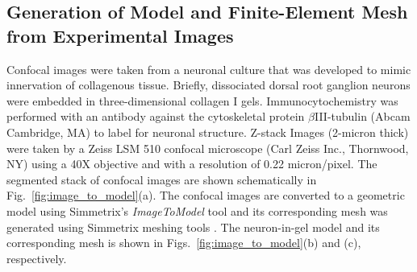 \documentclass[10pt]{asme2ej}
\begin{document}
\subsection{Generation of Model and Finite-Element Mesh from Experimental Images}
Confocal images were taken from a neuronal culture that was developed to mimic innervation of collagenous tissue. Briefly, dissociated dorsal root ganglion neurons were embedded in three-dimensional collagen I gels. Immunocytochemistry was performed with an antibody against the cytoskeletal protein $\beta$III-tubulin (Abcam Cambridge, MA) to label for neuronal structure. Z-stack Images (2-micron thick) were taken by a Zeiss LSM 510 confocal microscope (Carl Zeiss Inc., Thornwood, NY) using a 40X objective and with a resolution of 0.22 micron/pixel. The segmented stack of confocal images are shown schematically in Fig.\ \ref{fig:image_to_model}(a). The confocal images are converted to a geometric model using Simmetrix's \textit{ImageToModel} tool \cite{Klaas_chapter, Klaas_conference, simmetrix} and its corresponding mesh was generated using Simmetrix meshing tools \cite{simmetrix,Shephard:2000vc}. The neuron-in-gel model and its corresponding mesh is shown in Figs.\ \ref{fig:image_to_model}(b) and (c), respectively. 
%
\end{document}
